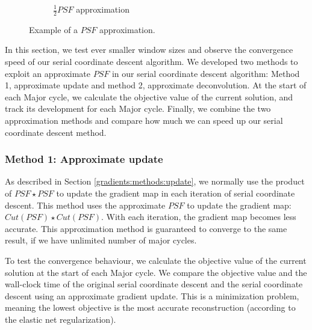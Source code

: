 \begin{figure}[h]
\begin{subfigure}[b]{0.245\linewidth}
		\caption{$\frac{1}{2}PSF$ approximation}
	\end{subfigure}
	\caption{Example of a $PSF$ approximation.}
	\label{results:gradients:clark}
\end{figure}

In this section, we test ever smaller window sizes and observe the convergence speed of our serial coordinate descent algorithm. We developed two methods to exploit an approximate $PSF$ in our serial coordinate descent algorithm: Method 1, approximate update and method 2, approximate deconvolution. At the start of each Major cycle, we calculate the objective value of the current solution, and track its development for each Major cycle. Finally, we combine the two approximation methods and compare how much we can speed up our serial coordinate descent method.


\subsubsection{Method 1: Approximate update}
As described in Section \ref{gradients:methods:update}, we normally use the product of $PSF \star PSF$ to update the gradient map in each iteration of serial coordinate descent. This method uses the approximate $PSF$ to update the gradient map: $Cut(PSF) \star Cut(PSF)$. With each iteration, the gradient map becomes less accurate. This approximation method is guaranteed to converge to the same result, if we have unlimited number of major cycles.
	
To test the convergence behaviour, we calculate the objective value of the current solution at the start of each Major cycle. We compare the objective value and the wall-clock time of the original serial coordinate descent and the serial coordinate descent using an approximate gradient update. This is a minimization problem, meaning the lowest objective is the most accurate reconstruction (according to the elastic net regularization).

